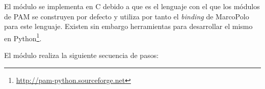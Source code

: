 El módulo se implementa en C debido a que es el lenguaje con el que los módulos de PAM se construyen por defecto y utiliza por tanto el \textit{binding} de MarcoPolo para este lenguaje. Existen sin embargo herramientas para desarrollar el mismo en Python\footnote{\href{http://pam-python.sourceforge.net/}{http://pam-python.sourceforge.net}}.









El módulo realiza la siguiente secuencia de pasos:

